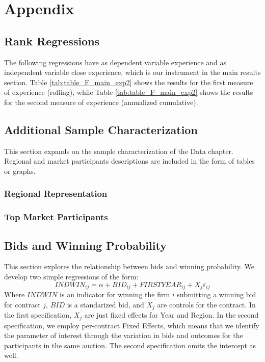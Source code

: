 \chapter{Appendix}
\section{Rank Regressions}
\label{section:appendix_rank}
The following regressions have as dependent variable experience and as independent variable close experience, which is our instrument in the main results section. Table \ref{tab:table_F_main_exp2} shows the results for the first measure of experience (rolling), while Table \ref{tab:table_F_main_exp2} shows the results for the second measure of experience (annualized cumulative).



\clearpage
\section{Additional Sample Characterization}
This section expands on the sample characterization of the Data chapter. Regional and market participants descriptions are included in the form of tables or graphs.

\subsection{Regional Representation}

\clearpage

\subsection{Top Market Participants}

\small

\clearpage


\section{Bids and Winning Probability}
This section explores the relationship between bids and winning probability. We develop two simple regressions of the form:
\begin{equation}
  \label{eqn:helpbids}
INDWIN_{ij}  = \alpha +BID_{ij}+  FIRSTYEAR_{ij}+X_j\varepsilon_{ij}
\end{equation}
Where $INDWIN$ is an indicator for winning the firm $i$ submitting a winning bid for contract $j$, $BID$ is a standarized bid, and $X_j$ are controls for the contract. In the first specification, $X_j$ are just fixed effects for Year and Region. In the second specification, we employ per-contract Fixed Effects, which means that we identify the parameter of interest through the variation in bids and outcomes for the participants in the same auction. The second specification omits the intercept as well.

